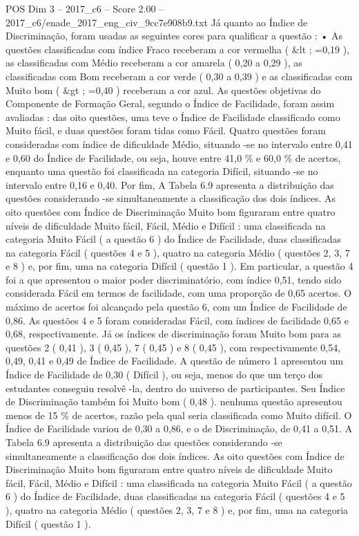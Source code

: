 \begin{textsample}{POS Dim 3 – 2017\_c6 – Score 2.00 – 2017\_c6/enade\_2017\_eng\_civ\_9cc7e908b9.txt}
Já quanto ao Índice de Discriminação, foram usadas as seguintes cores para qualificar a questão : • As questões classificadas com índice Fraco receberam a cor vermelha ( \&lt ; =0,19 ), as classificadas com Médio receberam a cor amarela ( 0,20 a 0,29 ), as classificadas com Bom receberam a cor verde ( 0,30 a 0,39 ) e as classificadas com Muito bom ( \&gt ; =0,40 ) receberam a cor azul.
As questões objetivas do Componente de Formação Geral, segundo o Índice de Facilidade, foram assim avaliadas : das oito questões, uma teve o Índice de Facilidade classificado como Muito fácil, e duas questões foram tidas como Fácil.
Quatro questões foram consideradas com índice de dificuldade Médio, situando -se no intervalo entre 0,41 e 0,60 do Índice de Facilidade, ou seja, houve entre 41,0 \% e 60,0 \% de acertos, enquanto uma questão foi classificada na categoria Difícil, situando -se no intervalo entre 0,16 e 0,40.
Por fim, A Tabela 6.9 apresenta a distribuição das questões considerando -se simultaneamente a classificação dos dois índices.
As oito questões com Índice de Discriminação Muito bom figuraram entre quatro níveis de dificuldade Muito fácil, Fácil, Médio e Difícil : uma classificada na categoria Muito Fácil ( a questão 6 ) do Índice de Facilidade, duas classificadas na categoria Fácil ( questões 4 e 5 ), quatro na categoria Médio ( questões 2, 3, 7 e 8 ) e, por fim, uma na categoria Difícil ( questão 1 ).
Em particular, a questão 4 foi a que apresentou o maior poder discriminatório, com índice 0,51, tendo sido considerada Fácil em termos de facilidade, com uma proporção de 0,65 acertos.
O máximo de acertos foi alcançado pela questão 6, com um Índice de Facilidade de 0,86.
As questões 4 e 5 foram consideradas Fácil, com índices de facilidade 0,65 e 0,68, respectivamente.
Já os índices de discriminação foram Muito bom para as questões 2 ( 0,41 ), 3 ( 0,45 ), 7 ( 0,45 ) e 8 ( 0,45 ), com respectivamente 0,54, 0,49, 0,41 e 0,49 de Índice de Facilidade.
A questão de número 1 apresentou um Índice de Facilidade de 0,30 ( Difícil ), ou seja, menos do que um terço dos estudantes conseguiu resolvê -la, dentro do universo de participantes.
Seu Índice de Discriminação também foi Muito bom ( 0,48 ). nenhuma questão apresentou menos de 15 \% de acertos, razão pela qual seria classificada como Muito difícil.
O Índice de Facilidade variou de 0,30 a 0,86, e o de Discriminação, de 0,41 a 0,51.
A Tabela 6.9 apresenta a distribuição das questões considerando -se simultaneamente a classificação dos dois índices.
As oito questões com Índice de Discriminação Muito bom figuraram entre quatro níveis de dificuldade Muito fácil, Fácil, Médio e Difícil : uma classificada na categoria Muito Fácil ( a questão 6 ) do Índice de Facilidade, duas classificadas na categoria Fácil ( questões 4 e 5 ), quatro na categoria Médio ( questões 2, 3, 7 e 8 ) e, por fim, uma na categoria Difícil ( questão 1 ).

\end{textsample}
